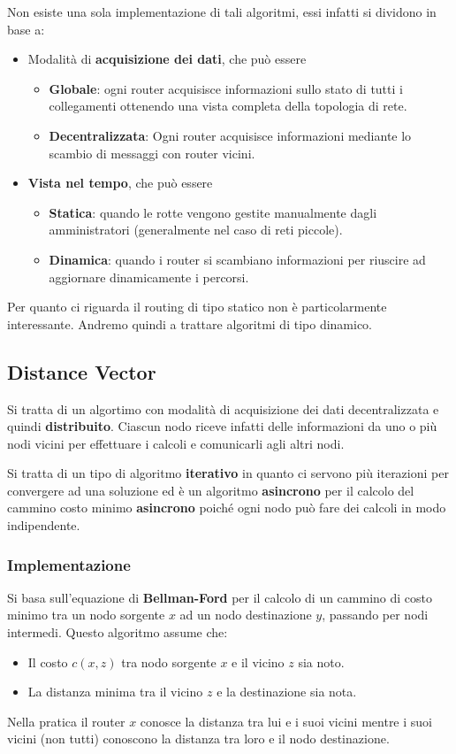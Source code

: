 Non esiste una sola implementazione di tali algoritmi, essi infatti si 
dividono in base a:
\begin{itemize}
	\item Modalità di \textbf{acquisizione dei dati}, che può essere
		\begin{itemize}
			\item \textbf{Globale}: ogni router acquisisce informazioni
				sullo stato di tutti i collegamenti ottenendo una
				vista completa della topologia di rete.
			\item \textbf{Decentralizzata}: Ogni router acquisisce
				informazioni mediante lo scambio di messaggi con 
				router vicini.
		\end{itemize}
	\item \textbf{Vista nel tempo}, che può essere
		\begin{itemize}
			\item \textbf{Statica}: quando le rotte vengono gestite
				manualmente dagli amministratori (generalmente nel caso
				di reti piccole).
			\item \textbf{Dinamica}: quando i router si scambiano 
				informazioni per riuscire ad aggiornare dinamicamente 
				i percorsi.
		\end{itemize}
\end{itemize}
Per quanto ci riguarda il routing di tipo statico non è particolarmente
interessante. Andremo quindi a trattare algoritmi di tipo dinamico.

\subsection{Distance Vector}
Si tratta di un algortimo con modalità di acquisizione dei dati
decentralizzata e quindi \textbf{distribuito}. Ciascun nodo riceve
infatti delle informazioni da uno o più nodi vicini per effettuare
i calcoli e comunicarli agli altri nodi.

Si tratta di un tipo di algoritmo \textbf{iterativo} in quanto ci
servono più iterazioni per convergere ad una soluzione ed è un 
algoritmo \textbf{asincrono} per il calcolo del cammino costo minimo 
\textbf{asincrono} poiché ogni nodo può fare dei calcoli in modo
indipendente.

\subsubsection{Implementazione}
Si basa sull'equazione di \textbf{Bellman-Ford} per il calcolo di un
cammino di costo minimo tra un nodo sorgente $x$ ad un nodo 
destinazione $y$, passando per nodi intermedi. Questo algoritmo assume
che:
\begin{itemize}
	\item Il costo $c(x,z)$ tra nodo sorgente $x$ e il vicino $z$ sia
		noto.
	\item La distanza minima tra il vicino $z$ e la destinazione sia
		nota.
\end{itemize}
Nella pratica il router $x$ conosce la distanza tra lui e i suoi vicini
mentre i suoi vicini (non tutti) conoscono la distanza tra loro e il
nodo destinazione.

